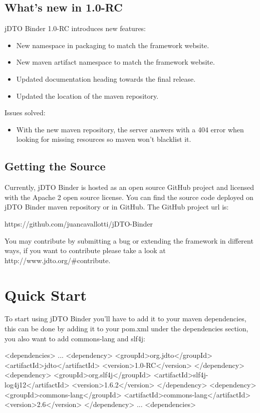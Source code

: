 \documentclass[11pt]{article}
\newcommand{\JDTO}{jDTO Binder\xspace}
\newcommand{\JDV}{1.0-RC\xspace}
\begin{document}
\subsection{What's new in \JDV}

\JDTO \JDV introduces new features:
\begin{itemize}
\item New namespace in packaging to match the framework website.
\item New maven artifact namespace to match the framework website.
\item Updated documentation heading towards the final release.
\item Updated the location of the maven repository.
\end{itemize}

Issues solved:
\begin{itemize}
\item With the new maven repository, the server answers with a 404 error when looking for missing resources so maven won't blacklist it.
\end{itemize}

\subsection{Getting the Source}

Currently, \JDTO is hosted as an open source GitHub project and licensed with the Apache 2 open source license. You can find the source code deployed on \JDTO maven repository or in GitHub. The GitHub project url is: 

https://github.com/juancavallotti/jDTO-Binder

You may contribute by submitting a bug or extending the framework in different ways, if you want to contribute please take a look at http://www.jdto.org/\#contribute.

\section{Quick Start}


To start using \JDTO you'll have to add it to your maven dependencies, this can be done
by adding it to your pom.xml under the dependencies section, you also want to add commons-lang and slf4j:

\begin{xml}
     <dependencies>
     ...
        <dependency>
            <groupId>org.jdto</groupId>
            <artifactId>jdto</artifactId>
            <version>1.0-RC</version>
        </dependency>
        <dependency>
            <groupId>org.slf4j</groupId>
            <artifactId>slf4j-log4j12</artifactId>
            <version>1.6.2</version>
        </dependency>
        <dependency>
            <groupId>commons-lang</groupId>
            <artifactId>commons-lang</artifactId>
            <version>2.6</version>
        </dependency>
     ...
     <dependencies>
\end{xml}
\end{document}
